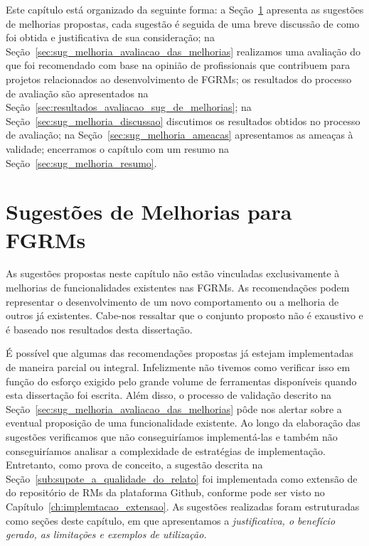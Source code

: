 Este capítulo está organizado da seguinte forma: a
Seção~\ref{sec:sug_melhoria_melhorando_as_ferraementas} apresenta as sugestões
de melhorias propostas, cada sugestão é seguida de uma breve discussão de como
foi obtida e justificativa de sua consideração; na
Seção~\ref{sec:sug_melhoria_avaliacao_das_melhorias} realizamos uma avaliação do
que foi recomendado com base na opinião de profissionais que contribuem para
projetos relacionados ao desenvolvimento de FGRMs; os resultados do processo de
avaliação são apresentados na
Seção~\ref{sec:resultados_avaliacao_sug_de_melhorias}; na
Seção~\ref{sec:sug_melhoria_discussao} discutimos os resultados obtidos no
processo de avaliação; na Seção~\ref{sec:sug_melhoria_ameacas} apresentamos as
ameaças à validade; encerramos o capítulo com um resumo na
Seção~\ref{sec:sug_melhoria_resumo}.

\section{Sugestões de Melhorias para FGRMs}
\label{sec:sug_melhoria_melhorando_as_ferraementas}

As sugestões propostas neste capítulo não estão vinculadas exclusivamente à
melhorias de funcionalidades existentes nas FGRMs. As recomendações podem
representar o desenvolvimento de um novo comportamento ou a melhoria de outros
já existentes. Cabe-nos ressaltar que o conjunto proposto não é exaustivo e é
baseado nos resultados desta dissertação.

É possível que algumas das recomendações propostas já estejam implementadas de
maneira parcial ou integral.  Infelizmente não tivemos como verificar isso em
função do esforço exigido pelo grande volume de ferramentas disponíveis quando
esta dissertação foi escrita. Além disso, o processo de validação descrito na
Seção~\ref{sec:sug_melhoria_avaliacao_das_melhorias} pôde nos alertar sobre a
eventual proposição de uma funcionalidade existente. Ao longo da elaboração das
sugestões verificamos que não conseguiríamos implementá-las e também não
conseguiríamos analisar a complexidade de estratégias de implementação.
Entretanto, como prova de conceito, a sugestão descrita na
Seção~\ref{sub:supote_a_qualidade_do_relato} foi implementada como extensão de
do repositório de RMs da plataforma Github, conforme pode ser visto no
Capítulo~\ref{ch:implemtacao_extensao}. As sugestões realizadas foram
estruturadas como seções deste capítulo, em que apresentamos a
\textit{justificativa, o benefício gerado, as limitações e exemplos de
    utilização.}

